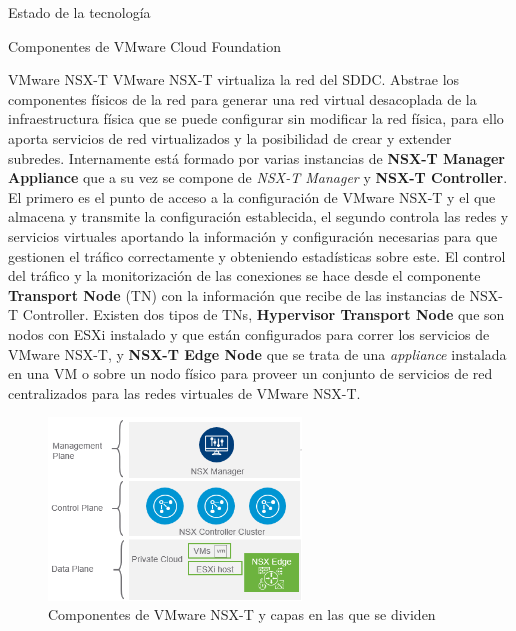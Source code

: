 \begin{section}{Estado de la tecnología}
\begin{subsection}{Componentes de VMware Cloud Foundation}
\begin{subsubsection}{VMware NSX-T}
    VMware NSX-T virtualiza la red del SDDC. Abstrae los componentes físicos de la red para generar una red virtual desacoplada de la infraestructura física que se puede configurar sin modificar la red física, para ello aporta servicios de red virtualizados y la posibilidad de crear y extender subredes. Internamente está formado por varias instancias de \textbf{NSX-T Manager Appliance} que a su vez se compone de \textit{NSX-T Manager} y \textbf{NSX-T Controller}. El primero es el punto de acceso a la configuración de VMware NSX-T y el que almacena y transmite la configuración establecida, el segundo controla las redes y servicios virtuales aportando la información y configuración necesarias para que gestionen el tráfico correctamente y obteniendo estadísticas sobre este. El control del tráfico y la monitorización de las conexiones se hace desde el componente \textbf{Transport Node} (TN) con la información que recibe de las instancias de NSX-T Controller. Existen dos tipos de TNs, \textbf{Hypervisor Transport Node} que son nodos con ESXi instalado y que están configurados para correr los servicios de VMware NSX-T, y \textbf{NSX-T Edge Node} que se trata de una \textit{appliance} instalada en una VM o sobre un nodo físico para proveer un conjunto de servicios de red centralizados para las redes virtuales de VMware NSX-T.
    \begin{figure}[h!]
        \centering
            \includegraphics[width=0.6\textwidth]{imaxes/VCF-componentes/nsx-t-layers.png}
            \caption{Componentes de VMware NSX-T y capas en las que se dividen}
            \label{fig:nsx-t-components}
        \end{figure}
        \FloatBarrier
\end{subsubsection}


\end{subsection}
\end{section}
